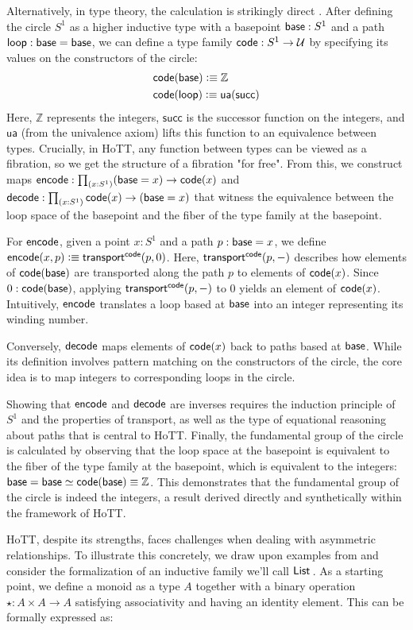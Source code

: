 \documentclass[main.tex]{subfiles}
\begin{document}
Alternatively, in type theory, the calculation is strikingly direct \cite{licata_shulman_fundamental}. After defining the circle $S^1$ as a higher inductive type with a basepoint $\mathsf{base} : S^1$ and a path $\mathsf{loop} : \mathsf{base} = \mathsf{base}$, we can define a type family $\mathsf{code} : S^1 \to \mathcal{U}$ by specifying its values on the constructors of the circle:
\begin{align*}
	&\mathsf{code}(\mathsf{base}) \vcentcolon\equiv \mathbb{Z} \\
	&\mathsf{code}(\mathsf{loop}) \vcentcolon\equiv \mathsf{ua}(\mathsf{succ})
\end{align*}
Here, $\mathbb{Z}$ represents the integers, $\mathsf{succ}$ is the successor function on the integers, and $\mathsf{ua}$ (from the univalence axiom) lifts this function to an equivalence between types. Crucially, in HoTT, any function between types can be viewed as a fibration, so we get the structure of a fibration "for free". From this, we construct maps $\eco : \prd{x:S^1}(\ba = x) \to \co(x)$ and $\dco : \prd{x : S^1}\co(x) \to (\ba = x)$ that witness the equivalence between the loop space of the basepoint and the fiber of the type family at the basepoint.

For $\mathsf{encode}$, given a point $x:S^1$ and a path $p : \mathsf{base} = x$, we define $\mathsf{encode}(x,p) \vcentcolon\equiv \mathsf{transport}^{\mathsf{code}}(p,0)$. Here, $\mathsf{transport}^{\mathsf{code}}(p,-)$ describes how elements of $\mathsf{code}(\mathsf{base})$ are transported along the path $p$ to elements of $\mathsf{code}(x)$. Since $0 : \mathsf{code}(\mathsf{base})$, applying $\mathsf{transport}^{\mathsf{code}}(p,-)$ to $0$ yields an element of $\mathsf{code}(x)$. Intuitively, $\mathsf{encode}$ translates a loop based at $\mathsf{base}$ into an integer representing its winding number.

Conversely, $\mathsf{decode}$ maps elements of $\mathsf{code}(x)$ back to paths based at $\mathsf{base}$. While its definition involves pattern matching on the constructors of the circle, the core idea is to map integers to corresponding loops in the circle.

Showing that $\mathsf{encode}$ and $\mathsf{decode}$ are inverses requires the induction principle of $S^1$ and the properties of transport, as well as the type of equational reasoning about paths that is central to HoTT. Finally, the fundamental group of the circle is calculated by observing that the loop space at the basepoint is equivalent to the fiber of the type family at the basepoint, which is equivalent to the integers: $\mathsf{base} = \mathsf{base} \simeq \mathsf{code}(\mathsf{base}) \equiv \mathbb{Z}$. This demonstrates that the fundamental group of the circle is indeed the integers, a result derived directly and synthetically within the framework of HoTT.


HoTT, despite its strengths, faces challenges when dealing with asymmetric relationships. To illustrate this concretely, we draw upon examples from \cite{daniel_r_licata_2-dimensional_2011, gratzer_directed_2024} and consider the formalization of an inductive family we'll call $\Li$. As a starting point, we define a monoid as a type $A$ together with a binary operation $\star : A \times A \to A$ satisfying associativity and having an identity element. This can be formally expressed as:
\end{document}

